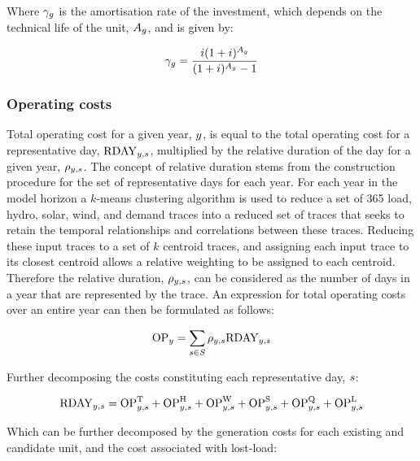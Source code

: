 \documentclass{article}
\begin{document}
Where $\cAmortisationRate$ is the amortisation rate of the investment, which depends on the technical life of the unit, $\cAssetLifetime$, and is given by:

\begin{equation}
\cAmortisationRate = \frac{\cInterestRate(1+\cInterestRate)^{\cAssetLifetime}}{(1+\cInterestRate)^{\cAssetLifetime} - 1}
\end{equation}


\subsubsection{Operating costs}

Total operating cost for a given year, $\iYear$, is equal to the total operating cost for a representative day, $\cOperatingCostScenario$, multiplied by the relative duration of the day for a given year, $\cScenarioDuration$. The concept of relative duration stems from the construction procedure for the set of representative days for each year. For each year in the model horizon a $k$-means clustering algorithm is used to reduce a set of 365 load, hydro, solar, wind, and demand traces into a reduced set of traces that seeks to retain the temporal relationships and correlations between these traces. Reducing these input traces to a set of $k$ centroid traces, and assigning each input trace to its closest centroid allows a relative weighting to be assigned to each centroid. Therefore the relative duration, $\cScenarioDuration$, can be considered as the number of days in a year that are represented by the trace. An expression for total operating costs over an entire year can then be formulated as follows:

\begin{equation}
\cOperatingCost[\iYear] = \sum\limits_{\iScenario \in \sScenarios} \cScenarioDuration \cOperatingCostScenario
\end{equation}

Further decomposing the costs constituting each representative day, $\iScenario$:

\begin{equation}
\cOperatingCostScenario = \cOperatingCostThermal + \cOperatingCostHydro + \cOperatingCostWind + \cOperatingCostSolar + \cOperatingCostStorage + \cOperatingCostLostLoad
\end{equation}

Which can be further decomposed by the generation costs for each existing and candidate unit, and the cost associated with lost-load:
\end{document}
